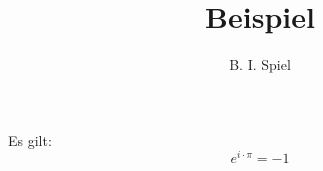 \documentclass{article}
\title{Beispiel}
\author{B. I. Spiel}
\begin{document}
\maketitle


Es gilt:
\[ e^{i\cdot\pi} = -1 \]
\end{document}
